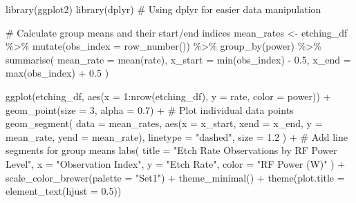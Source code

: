 \documentclass[
  letterpaper,
  DIV=11,
  numbers=noendperiod]{scrreprt}
\newenvironment{Shaded}{\begin{snugshade}}{\end{snugshade}}
\newcommand{\AttributeTok}[1]{\textcolor[rgb]{0.40,0.45,0.13}{#1}}
\newcommand{\CommentTok}[1]{\textcolor[rgb]{0.37,0.37,0.37}{#1}}
\newcommand{\DecValTok}[1]{\textcolor[rgb]{0.68,0.00,0.00}{#1}}
\newcommand{\FloatTok}[1]{\textcolor[rgb]{0.68,0.00,0.00}{#1}}
\newcommand{\FunctionTok}[1]{\textcolor[rgb]{0.28,0.35,0.67}{#1}}
\newcommand{\NormalTok}[1]{\textcolor[rgb]{0.00,0.23,0.31}{#1}}
\newcommand{\OtherTok}[1]{\textcolor[rgb]{0.00,0.23,0.31}{#1}}
\newcommand{\SpecialCharTok}[1]{\textcolor[rgb]{0.37,0.37,0.37}{#1}}
\newcommand{\StringTok}[1]{\textcolor[rgb]{0.13,0.47,0.30}{#1}}
\begin{document}
\begin{Shaded}
\begin{Highlighting}[]
\FunctionTok{library}\NormalTok{(ggplot2)}
\FunctionTok{library}\NormalTok{(dplyr) }\CommentTok{\# Using dplyr for easier data manipulation}

\CommentTok{\# Calculate group means and their start/end indices}
\NormalTok{mean\_rates }\OtherTok{\textless{}{-}}\NormalTok{ etching\_df }\SpecialCharTok{\%\textgreater{}\%}
  \FunctionTok{mutate}\NormalTok{(}\AttributeTok{obs\_index =} \FunctionTok{row\_number}\NormalTok{()) }\SpecialCharTok{\%\textgreater{}\%}
  \FunctionTok{group\_by}\NormalTok{(power) }\SpecialCharTok{\%\textgreater{}\%}
  \FunctionTok{summarise}\NormalTok{(}
    \AttributeTok{mean\_rate =} \FunctionTok{mean}\NormalTok{(rate),}
    \AttributeTok{x\_start =} \FunctionTok{min}\NormalTok{(obs\_index) }\SpecialCharTok{{-}} \FloatTok{0.5}\NormalTok{,}
    \AttributeTok{x\_end =} \FunctionTok{max}\NormalTok{(obs\_index) }\SpecialCharTok{+} \FloatTok{0.5}
\NormalTok{  )}

\FunctionTok{ggplot}\NormalTok{(etching\_df, }\FunctionTok{aes}\NormalTok{(}\AttributeTok{x =} \DecValTok{1}\SpecialCharTok{:}\FunctionTok{nrow}\NormalTok{(etching\_df), }\AttributeTok{y =}\NormalTok{ rate, }\AttributeTok{color =}\NormalTok{ power)) }\SpecialCharTok{+}
  \FunctionTok{geom\_point}\NormalTok{(}\AttributeTok{size =} \DecValTok{3}\NormalTok{, }\AttributeTok{alpha =} \FloatTok{0.7}\NormalTok{) }\SpecialCharTok{+} \CommentTok{\# Plot individual data points}
  \FunctionTok{geom\_segment}\NormalTok{(}
    \AttributeTok{data =}\NormalTok{ mean\_rates, }
    \FunctionTok{aes}\NormalTok{(}\AttributeTok{x =}\NormalTok{ x\_start, }\AttributeTok{xend =}\NormalTok{ x\_end, }\AttributeTok{y =}\NormalTok{ mean\_rate, }\AttributeTok{yend =}\NormalTok{ mean\_rate),}
    \AttributeTok{linetype =} \StringTok{"dashed"}\NormalTok{, }
    \AttributeTok{size =} \FloatTok{1.2}
\NormalTok{  ) }\SpecialCharTok{+} \CommentTok{\# Add line segments for group means}
  \FunctionTok{labs}\NormalTok{(}
    \AttributeTok{title =} \StringTok{"Etch Rate Observations by RF Power Level"}\NormalTok{,}
    \AttributeTok{x =} \StringTok{"Observation Index"}\NormalTok{,}
    \AttributeTok{y =} \StringTok{"Etch Rate"}\NormalTok{,}
    \AttributeTok{color =} \StringTok{"RF Power (W)"}
\NormalTok{  ) }\SpecialCharTok{+}
  \FunctionTok{scale\_color\_brewer}\NormalTok{(}\AttributeTok{palette =} \StringTok{"Set1"}\NormalTok{) }\SpecialCharTok{+}
  \FunctionTok{theme\_minimal}\NormalTok{() }\SpecialCharTok{+}
  \FunctionTok{theme}\NormalTok{(}\AttributeTok{plot.title =} \FunctionTok{element\_text}\NormalTok{(}\AttributeTok{hjust =} \FloatTok{0.5}\NormalTok{))}
\end{Highlighting}
\end{Shaded}
\end{document}
